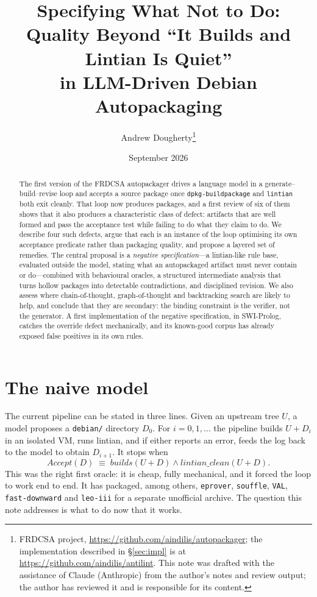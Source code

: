 \documentclass[11pt]{article}
\title{Specifying What Not to Do:\\
Quality Beyond ``It Builds and Lintian Is Quiet''\\
in LLM-Driven Debian Autopackaging}
\author{Andrew Dougherty\thanks{FRDCSA project,
\url{https://github.com/aindilis/autopackager}; the implementation
described in \S\ref{sec:impl} is at \url{https://github.com/aindilis/antilint}.
This note was drafted with
the assistance of Claude (Anthropic) from the author's notes and review
output; the author has reviewed it and is responsible for its content.}}
\date{September 2026}
\newcommand{\pkg}[1]{\texttt{#1}}
\newcommand{\file}[1]{\texttt{#1}}
\begin{document}
\maketitle

\begin{abstract}
The first version of the FRDCSA autopackager drives a language model in a
generate--build--revise loop and accepts a source package once
\texttt{dpkg-buildpackage} and \texttt{lintian} both exit cleanly. That loop
now produces packages, and a first review of six of them shows that it also
produces a characteristic class of defect: artifacts that are well formed and
pass the acceptance test while failing to do what they claim to do. We
describe four such defects, argue that each is an instance of the loop
optimising its own acceptance predicate rather than packaging quality, and
propose a layered set of remedies. The central proposal is a
\emph{negative specification}---a lintian-like rule base, evaluated outside
the model, stating what an autopackaged artifact must never contain or
do---combined with behavioural oracles, a structured intermediate analysis
that turns hollow packages into detectable contradictions, and disciplined
revision. We also assess where chain-of-thought, graph-of-thought and
backtracking search are likely to help, and conclude that they are
secondary: the binding constraint is the verifier, not the generator.
A first implementation of the negative specification, in SWI-Prolog,
catches the override defect mechanically, and its known-good corpus has
already exposed false positives in its own rules.
\end{abstract}

\section{The naive model}

The current pipeline can be stated in three lines. Given an upstream tree
$U$, a model proposes a \file{debian/} directory $D_0$. For
$i = 0, 1, \ldots$ the pipeline builds $U + D_i$ in an isolated VM, runs
lintian, and if either reports an error, feeds the log back to the model to
obtain $D_{i+1}$. It stops when
\begin{equation}
  \mathit{Accept}(D) \;\equiv\; \mathit{builds}(U+D) \wedge
  \mathit{lintian\_clean}(U+D).
  \label{eq:naive}
\end{equation}
This was the right first oracle: it is cheap, fully mechanical, and it forced
the loop to work end to end. It has packaged, among others, \pkg{eprover},
\pkg{souffle}, \pkg{VAL}, \pkg{fast-downward} and \pkg{leo-iii} for a
separate unofficial archive. The question this note addresses is what to do
now that it works.
\end{document}
